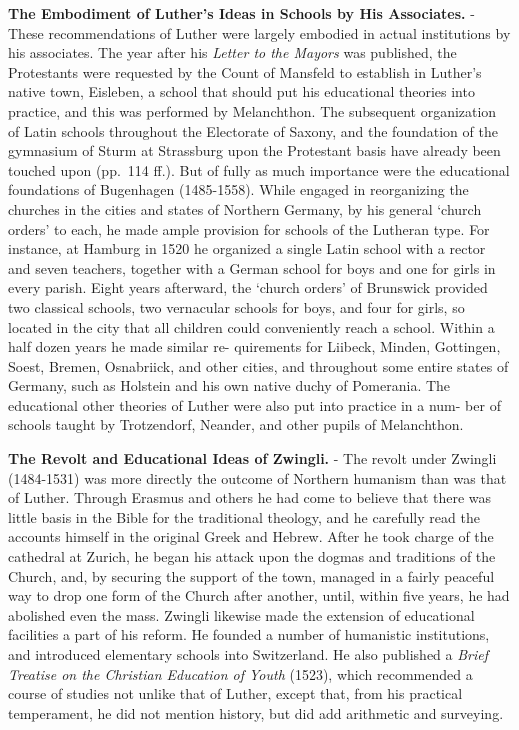 \documentclass[]{book}
\begin{document}
\textbf{The Embodiment of Luther's Ideas in Schools by His Associates.} - These recommendations of Luther were largely embodied in actual institutions by his associates. The year after his \emph{Letter to the Mayors} was published, the Protestants were requested by the Count of Mansfeld to establish in Luther's native town, Eisleben, a school that should put his educational theories into practice, and this was performed by Melanchthon. The subsequent organization of Latin schools throughout the Electorate of Saxony, and the foundation of the gymnasium of Sturm at Strassburg upon the Protestant basis have already been touched upon (pp.~114 ff.). But of fully as much importance were the educational foundations of Bugenhagen (1485-1558). While engaged in reorganizing the churches in the cities and states of Northern Germany, by his general `church orders' to each, he made ample provision for schools of the Lutheran type. For instance, at Hamburg in 1520 he organized a single Latin school with a rector and seven teachers, together with a German school for boys and one for girls in every parish. Eight years afterward, the `church orders' of Brunswick provided two classical schools, two vernacular schools for boys, and four for girls, so located in the city that all children could conveniently reach a school. Within a half dozen years he made similar re- quirements for Liibeck, Minden, Gottingen, Soest, Bremen, Osnabriick, and other cities, and throughout some entire states of Germany, such as Holstein and his own native duchy of Pomerania. The educational other theories of Luther were also put into practice in a num- ber of schools taught by Trotzendorf, Neander, and other pupils of Melanchthon.

\textbf{The Revolt and Educational Ideas of Zwingli.} - The revolt under Zwingli (1484-1531) was more directly the outcome of Northern humanism than was that of Luther. Through Erasmus and others he had come to believe that there was little basis in the Bible for the traditional theology, and he carefully read the accounts himself in the original Greek and Hebrew. After he took charge of the cathedral at Zurich, he began his attack upon the dogmas and traditions of the Church, and, by securing the support of the town, managed in a fairly peaceful way to drop one form of the Church after another, until, within five years, he had abolished even the mass. Zwingli likewise made the extension of educational facilities a part of his reform. He founded a number of humanistic institutions, and introduced elementary schools into Switzerland. He also published a \emph{Brief Treatise on the Christian Education of Youth} (1523), which recommended a course of studies not unlike that of Luther, except that, from his practical temperament, he did not mention history, but did add arithmetic and surveying.
\end{document}
